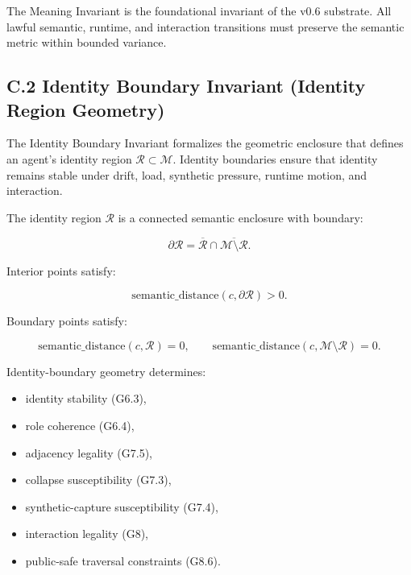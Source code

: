 \medskip

\noindent The Meaning Invariant is the foundational invariant of the v0.6
substrate. All lawful semantic, runtime, and interaction transitions must
preserve the semantic metric within bounded variance.



\subsection*{C.2 Identity Boundary Invariant (Identity Region Geometry)}

\noindent The Identity Boundary Invariant formalizes the geometric enclosure that
defines an agent’s identity region $\mathcal{R} \subset \mathcal{M}$. Identity
boundaries ensure that identity remains stable under drift, load, synthetic
pressure, runtime motion, and interaction.

\medskip

\noindent The identity region $\mathcal{R}$ is a connected semantic enclosure
with boundary:


\[
\partial \mathcal{R}
=
\overline{\mathcal{R}}
\cap
\overline{\mathcal{M} \setminus \mathcal{R}}.
\]



Interior points satisfy:


\[
\text{semantic\_distance}(c, \partial \mathcal{R}) > 0.
\]



Boundary points satisfy:


\[
\text{semantic\_distance}(c, \mathcal{R}) = 0,
\qquad
\text{semantic\_distance}(c, \mathcal{M} \setminus \mathcal{R}) = 0.
\]



\medskip

\noindent Identity-boundary geometry determines:
\begin{itemize}
    \item identity stability (G6.3),
    \item role coherence (G6.4),
    \item adjacency legality (G7.5),
    \item collapse susceptibility (G7.3),
    \item synthetic-capture susceptibility (G7.4),
    \item interaction legality (G8),
    \item public-safe traversal constraints (G8.6).
\end{itemize}

